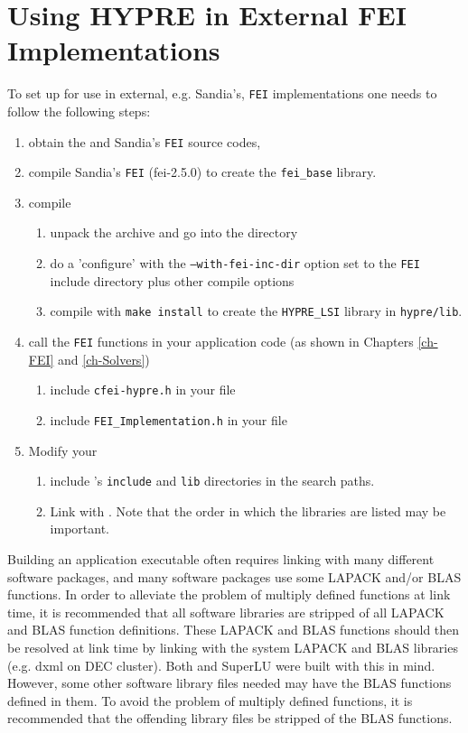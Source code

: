 \section{Using HYPRE in External FEI Implementations}
\label{LSI_install}
To set up \hypre{} for use in external, e.g. Sandia's, {\tt FEI} implementations
one needs to follow the following steps:
\begin{enumerate}
\item obtain the \hypre{} and Sandia's {\tt FEI} source codes,
\item compile Sandia's {\tt FEI} (fei-2.5.0) to create the
      {\tt fei\_base} library.
\item compile \hypre{}
\begin{enumerate}
\item unpack the archive and go into the  directory
\item do a 'configure' with the {\tt --with-fei-inc-dir} option set to
      the {\tt FEI} include directory plus other compile options
\item compile with {\tt make install} to create the
      {\tt HYPRE\_LSI} library in {\tt hypre/lib}.
\end{enumerate}
\item call the {\tt FEI} functions in your application code (as shown in
      Chapters \ref{ch-FEI} and \ref{ch-Solvers})
\begin{enumerate}
\item include {\tt cfei-hypre.h} in your file
\item include {\tt FEI\_Implementation.h} in your file
\end{enumerate}
\item Modify your 
\begin{enumerate}
\item include \hypre{}'s {\tt include} and {\tt lib} directories in the search paths.
\item Link with .
Note that the order in which the libraries are listed may be important.
\end{enumerate}
\end{enumerate}
Building an application executable often requires linking with many different
software packages, and many software packages use some LAPACK and/or BLAS
functions.  In order to alleviate the problem of multiply defined functions
at link time, it is recommended that all software libraries are stripped of
all LAPACK and BLAS function definitions.  These LAPACK and BLAS functions 
should then be resolved at link time by linking with the system LAPACK and
BLAS libraries (e.g. dxml on DEC cluster).  Both \hypre{} and SuperLU were
built with this in mind.  However, some other software library files needed
may have the BLAS functions defined in them.  To avoid the problem of
multiply defined functions, it is recommended that the offending library
files be stripped of the BLAS functions.

